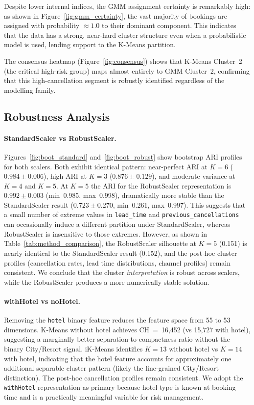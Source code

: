 \documentclass[12pt,a4paper]{article}
\begin{document}
Despite lower internal indices, the GMM assignment certainty is
remarkably high: as shown in Figure~\ref{fig:gmm_certainty}, the vast
majority of bookings are assigned with probability $\approx 1.0$ to
their dominant component.
This indicates that the data has a strong, near-hard cluster structure
even when a probabilistic model is used, lending support to the
K-Means partition.

The consensus heatmap (Figure~\ref{fig:consensus}) shows that K-Means
Cluster~2 (the critical high-risk group) maps almost entirely to GMM
Cluster~2, confirming that this high-cancellation segment is
robustly identified regardless of the modelling family.

\subsection{Robustness Analysis}
\label{sec:robustness}

\paragraph{StandardScaler vs RobustScaler.}
Figures~\ref{fig:boot_standard} and~\ref{fig:boot_robust} show bootstrap
ARI profiles for both scalers.
Both exhibit identical pattern: near-perfect ARI at $K=6$
($0.984 \pm 0.006$), high ARI at $K=3$ ($0.876 \pm 0.129$), and
moderate variance at $K=4$ and $K=5$. At $K=5$ the ARI for the RobustScaler representation is
$0.992 \pm 0.003$ (min~0.985, max~0.998), dramatically more stable than
the StandardScaler result ($0.723 \pm 0.270$, min~0.261, max~0.997).
This suggests that a small number of extreme values in \texttt{lead\_time}
and \texttt{previous\_cancellations} can occasionally induce a different
partition under StandardScaler, whereas RobustScaler is insensitive to
those extremes. However, as shown in Table~\ref{tab:method_comparison},
the RobustScaler silhouette at $K=5$ (0.151) is nearly identical to the
StandardScaler result (0.152), and the post-hoc cluster profiles
(cancellation rates, lead time distributions, channel profiles) remain
consistent.
We conclude that the cluster \emph{interpretation} is robust across
scalers, while the RobustScaler produces a more numerically stable solution.

\paragraph{withHotel vs noHotel.}
Removing the \texttt{hotel} binary feature reduces the feature space from
55 to 53 dimensions.
K-Means without hotel achieves CH~=~16,452 (vs 15,727 with hotel),
suggesting a marginally better separation-to-compactness ratio without the
binary City/Resort signal.
iK-Means identifies $K=13$ without hotel vs $K=14$ with hotel, indicating
that the hotel feature accounts for approximately one additional separable
cluster pattern (likely the fine-grained City/Resort distinction).
The post-hoc cancellation profiles remain consistent.
We adopt the \texttt{withHotel} representation as primary because hotel
type is known at booking time and is a practically meaningful variable
for risk management.
\end{document}
